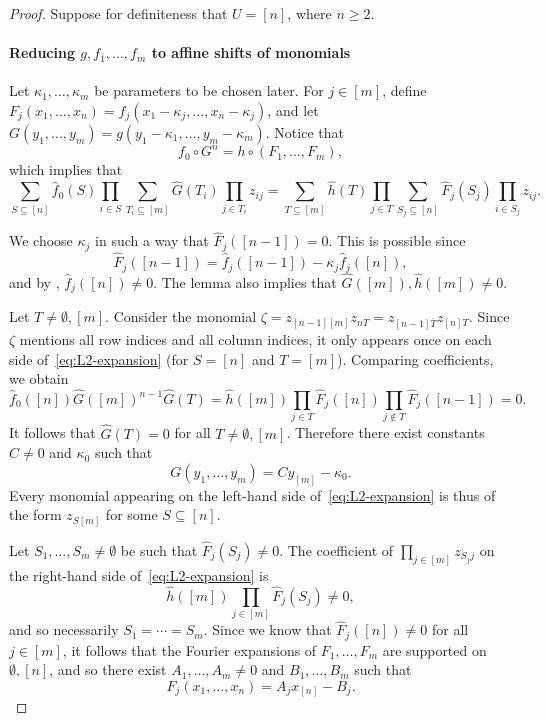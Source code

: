 \documentclass{article}
\theoremstyle{definition}
\theoremstyle{remark}
\renewcommand\geq{\geqslant}
\begin{document}
\begin{proof}
Suppose for definiteness that $U = [n]$, where $n \geq 2$.

\paragraph{Reducing $g,f_1,\ldots,f_m$ to affine shifts of monomials}
Let $\kappa_1,\ldots,\kappa_m$ be parameters to be chosen later. For $j \in [m]$, define $F_j(x_1,\ldots,x_n) = f_j(x_1 - \kappa_j,\ldots,x_n - \kappa_j)$, and let $G(y_1,\ldots,y_m) = g(y_1 - \kappa_1, \ldots, y_m - \kappa_m)$. Notice that
\[
 f_0 \circ G^n = h \circ (F_1,\ldots,F_m),
\]
which implies that
\begin{equation} \label{eq:L2-expansion}
 \sum_{S \subseteq [n]} \hat{f}_0(S) \prod_{i \in S} \sum_{T_i \subseteq [m]} \hat{G}(T_i) \prod_{j \in T_i} z_{ij} =
 \sum_{T \subseteq [m]} \hat{h}(T) \prod_{j \in T} \sum_{S_j \subseteq [n]} \hat{F}_j(S_j) \prod_{i \in S_j} z_{ij}.
\end{equation}

We choose $\kappa_j$ in such a way that $\hat{F}_j([n-1]) = 0$. This is possible since
\[
 \hat{F}_j([n-1]) = \hat{f}_j([n-1]) - \kappa_j \hat{f}_j([n]),
\]
and by , $\hat{f}_j([n]) \neq 0$. The lemma also implies that $\hat{G}([m]),\hat{h}([m]) \neq 0$.

Let $T \neq \emptyset,[m]$. Consider the monomial $\zeta = z_{[n-1][m]} z_{nT} = z_{[n-1] \overline{T}} z_{[n] T}$. Since $\zeta$ mentions all row indices and all column indices, it only appears once on each side of~\eqref{eq:L2-expansion} (for $S = [n]$ and $T = [m]$). Comparing coefficients, we obtain
\[
 \hat{f}_0([n]) \hat{G}([m])^{n-1} \hat{G}(T) = \hat{h}([m]) \prod_{j \in T} \hat{F}_j([n]) \prod_{j \notin T} \hat{F}_j([n-1]) = 0.
\]
It follows that $\hat{G}(T) = 0$ for all $T \neq \emptyset,[m]$. Therefore there exist constants $C \neq 0$ and $\kappa_0$ such that
\[
 G(y_1,\ldots,y_m) = C y_{[m]} - \kappa_0.
\]
Every monomial appearing on the left-hand side of~\eqref{eq:L2-expansion} is thus of the form $z_{S[m]}$ for some $S \subseteq [n]$.

Let $S_1,\ldots,S_m \neq \emptyset$ be such that $\hat{F}_j(S_j) \neq 0$. The coefficient of $\prod_{j \in [m]} z_{S_jj}$ on the right-hand side of~\eqref{eq:L2-expansion} is
\[
 \hat{h}([m]) \prod_{j \in [m]} \hat{F}_j(S_j) \neq 0,
\]
and so necessarily $S_1 = \cdots = S_m$. Since we know that $\hat{F}_j([n]) \neq 0$ for all $j \in [m]$, it follows that the Fourier expansions of $F_1,\ldots,F_m$ are supported on $\emptyset,[n]$, and so there exist $A_1,\ldots,A_m \neq 0$ and $B_1,\ldots,B_m$ such that
\[
 F_j(x_1,\ldots,x_n) = A_j x_{[n]} - B_j.
\]


\end{proof}
\end{document}
